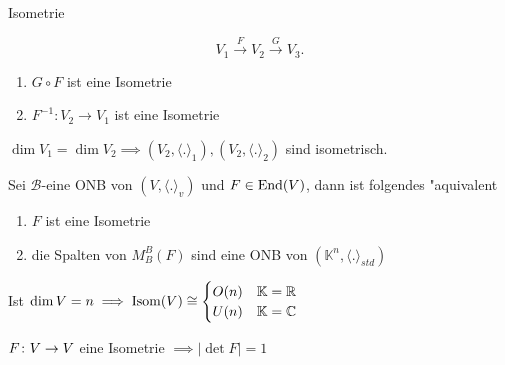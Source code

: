 \documentclass[class=article, crop=false]{standalone}
\begin{document}
\begin{zettel}{Isometrie}
\begin{remark}
	\[
		V_1 \stackrel{F}{\to} V_2 \stackrel{G}{\to} V_3
	.\]
	\begin{enumerate}
		\item $G \circ  F$ ist eine Isometrie
		\item $F^{-1}: V_2 \to  V_1$ ist eine Isometrie
	\end{enumerate}
\end{remark}

\begin{corollary}
	$\dim V_1 = \dim V_2 \implies  (V_2, \langle .\rangle_1), (V_2, \langle .\rangle_2)$  sind isometrisch.
\end{corollary}

\begin{theorem}[7.5]
	Sei $\mathcal{B}$-eine ONB von $(V, \langle .\rangle_v)$ und $F \in  \operatorname{End}(V)$, dann ist folgendes "aquivalent
	\begin{enumerate}
		\item $F$ ist eine Isometrie
		\item die Spalten von $M_B^B (F) $ sind eine ONB von $( \mathbb{K}^n, \langle .\rangle_{std})$
	\end{enumerate}
\end{theorem}

\begin{corollary}
	Ist $\dim V =n \implies \operatorname{Isom} (V) \cong \begin{cases} O (n) & \mathbb{K} = \mathbb{R} \\ U (n) & \mathbb{K} = \mathbb{C} \end{cases} $
\end{corollary}

\begin{corollary}
	$F \colon V\to V$ eine Isometrie $\implies |\det F| =1$
\end{corollary}


\end{zettel}
\end{document}
